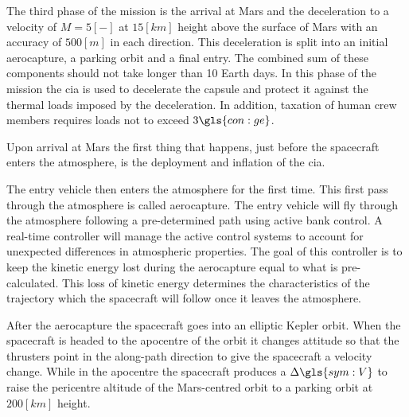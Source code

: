 The third phase of the mission is the arrival at Mars and the deceleration to a velocity of $M=5 \left[-\right]$ at $15 \left[km\right]$ height above the surface of Mars with an accuracy of $500 \left[m\right]$ in each direction. This deceleration is split into an initial aerocapture, a parking orbit and a final entry. The combined sum of these components should not take longer than 10 Earth days. In this phase of the mission the \gls{cia} is used to decelerate the capsule and protect it against the thermal loads imposed by the deceleration. In addition, taxation of human crew members requires loads not to exceed $3\gls{con:ge}$.

Upon arrival at Mars the first thing that happens, just before the spacecraft enters the atmosphere, is the deployment and inflation of the \gls{cia}. %

The entry vehicle then enters the atmosphere for the first time. This first pass through the atmosphere is called aerocapture. The entry vehicle will fly through the atmosphere following a pre-determined path using active bank control. A real-time controller will manage the active control systems to account for unexpected differences in atmospheric properties. The goal of this controller is to keep the kinetic energy lost during the aerocapture equal to what is pre-calculated. This loss of kinetic energy determines the characteristics of the trajectory which the spacecraft will follow once it leaves the atmosphere. %

After the aerocapture the spacecraft goes into an elliptic Kepler orbit. When the spacecraft is headed to the apocentre of the orbit it changes attitude so that the thrusters point in the along-path direction to give the spacecraft a velocity change. While in the apocentre the spacecraft produces a $\Delta\gls{sym:V}$ to raise the pericentre altitude of the Mars-centred orbit to a parking orbit at $200 \left[km\right]$ height.

